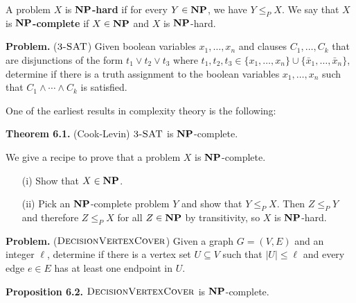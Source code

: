 \documentclass{article}
\DeclareMathOperator{\NP}{{\bf NP}}
\DeclareMathOperator{\SAT}{\textsc{3-SAT}}
\DeclareMathOperator{\DecisionVertexCover}{\textsc{DecisionVertexCover}}
\begin{document}
A problem $X$ is {\bf $\NP$-hard} if for every $Y \in \NP$, we have $Y \leq_P X$. 
We say that $X$ is {\bf $\NP$-complete} if $X \in \NP$ and $X$ is $\NP$-hard.

{\color{violet}
{\bf Problem.} ($\SAT$) Given boolean variables 
$x_1, \dots, x_n$ and clauses $C_1, \dots, C_k$ that are disjunctions 
of the form $t_1 \vee t_2 \vee t_3$ where $t_1, t_2, t_3 
\in \{x_1, \dots, x_n\} \cup \{\bar x_1, \dots, \bar x_n\}$,
determine if there is a truth assignment to the boolean 
variables $x_1, \dots, x_n$ such that $C_1 \wedge \cdots \wedge C_k$ 
is satisfied. 
}

One of the earliest results in complexity theory is the following: 

{\color{violet}
{\bf Theorem 6.1.} (Cook-Levin) $\SAT$ is $\NP$-complete. 
}

We give a recipe to prove that a problem $X$ is $\NP$-complete.
\begin{enumerate}
    \item [(i)] Show that $X \in \NP$. 
    \item [(ii)] Pick an $\NP$-complete problem $Y$ and show that $Y \leq_P X$. 
    Then $Z \leq_P Y$ and therefore $Z \leq_P X$ for all $Z \in \NP$ by transitivity, so 
    $X$ is $\NP$-hard.
\end{enumerate}

{\color{violet}
{\bf Problem.} ($\DecisionVertexCover$) Given a graph $G = (V, E)$ and an 
integer $\ell$, determine if there is a vertex set $U \subseteq V$ such that 
$|U| \leq \ell$ and every edge $e \in E$ has at least one endpoint in $U$.

{\bf Proposition 6.2.} $\DecisionVertexCover$ is $\NP$-complete. 
}
\end{document}
